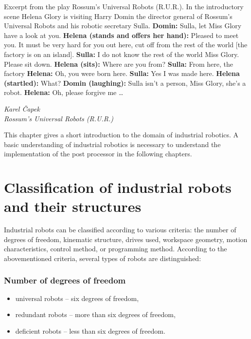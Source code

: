 \epigraph{

Excerpt from the play Rossum’s Universal Robots (R.U.R.).\break
In the introductory scene Helena Glory is visiting Harry Domin the director general of Rossum’s Universal Robots and his robotic secretary Sulla.\break
\break
\textbf{Domin:} Sulla, let Miss Glory have a look at you.\break
\textbf{Helena (stands and offers her hand):} Pleased to meet you. It must be very hard for you out here, cut off from the rest of the world [the factory is on an island].\break
\textbf{Sulla:} I do not know the rest of the world Miss Glory. Please sit down.\break
\textbf{Helena (sits):} Where are you from?\break
\textbf{Sulla:} From here, the factory\break
\textbf{Helena:} Oh, you were born here.\break
\textbf{Sulla:} Yes I was made here.\break
\textbf{Helena (startled):} What?\break
\textbf{Domin (laughing):} Sulla isn’t a person, Miss Glory, she’s a robot.\break
\textbf{Helena:} Oh, please forgive me …
}{\textit{Karel Čapek \\ Rossum’s Universal Robots (R.U.R.)}}

This chapter gives a short introduction to the domain of industrial robotics. A basic understanding of industrial robotics is necessary to understand the implementation of the post processor in the following chapters.

\section{Classification of industrial robots and their structures}

Industrial robots can be classified according to various criteria: the number of degrees of freedom, kinematic structure, drives used, workspace geometry, motion characteristics, control method, or programming method. According to the abovementioned criteria, several types of robots are distinguished:

\subsubsection*{Number of degrees of freedom}

\begin{itemize}
    \item universal robots -- six degrees of freedom,
    \item redundant robots -- more than six degrees of freedom,
    \item deficient robots -- less than six degrees of freedom.
\end{itemize}

